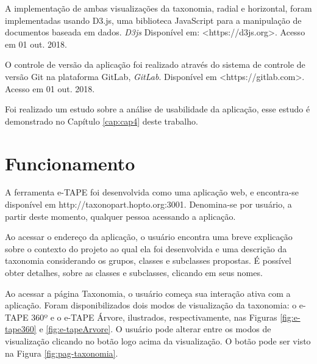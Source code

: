 \par
A implementação de ambas visualizações da taxonomia, radial e horizontal, foram implementadas usando D3.js, uma biblioteca JavaScript para a manipulação de documentos 
baseada em dados. \textit{D3js} Disponível em: <https://d3js.org>. Acesso em 01 out. 2018.

\par
O controle de versão da aplicação foi realizado através do sistema de controle de versão Git na plataforma GitLab, \textit{GitLab}. 
Disponível em <https://gitlab.com>. Acesso em 01 out. 2018.

\par
Foi realizado um estudo sobre a análise de usabilidade da aplicação, esse estudo é demonstrado no Capítulo \ref{cap:cap4} deste trabalho.
\newpage

\section{Funcionamento}
\label{sec:funcionamento}
A ferramenta e-TAPE foi desenvolvida como uma aplicação web, e encontra-se disponível em http://taxonopart.hopto.org:3001.
Denomina-se por usuário, a partir deste momento, qualquer pessoa acessando a aplicação. 

\par
Ao acessar o endereço da aplicação, o usuário encontra uma breve explicação sobre o contexto do projeto ao qual ela foi desenvolvida e uma descrição da taxonomia considerando os grupos,
classes e subclasses propostas. É possível obter detalhes, sobre as classes e subclasses, clicando em seus nomes. 

\par
Ao acessar a página Taxonomia, o usuário começa sua interação ativa com a aplicação.
Foram disponibilizados dois modos de visualização da taxonomia: o e-TAPE 360º e o e-TAPE Árvore, ilustrados, respectivamente,
nas Figuras \ref{fig:e-tape360} e \ref{fig:e-tapeArvore}. O usuário pode alterar entre os modos de visualização clicando no botão logo acima da visualização.
O botão pode ser visto na Figura \ref{fig:pag-taxonomia}.

\vspace{1cm}

